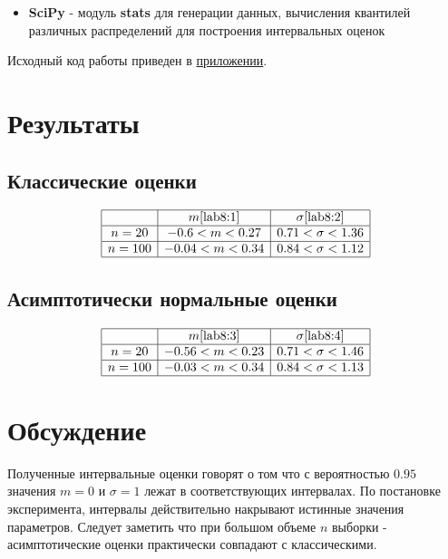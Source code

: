 \documentclass[12pt,a4paper]{article}
\begin{document}
\begin{itemize}
	\item \textbf{SciPy} - модуль \textbf{stats} для генерации данных, вычисления квантилей различных распределений для построения интервальных оценок
\end{itemize}

Исходный код работы приведен в \hyperref[sec:appl]{приложении}. 
\pagebreak

\section{Результаты}
\subsection{Классические оценки}
\begin{equation*}
\begin{array}{|c|c|c|}
	\hline 		& m\eqref{lab8:1} 	& \sigma\eqref{lab8:2} \\
	\hline n=20	& -0.6 < m < 0.27	& 0.71 < \sigma < 1.36 \\
	\hline n=100& -0.04 < m < 0.34 	& 0.84 < \sigma < 1.12 \\
	\hline
\end{array}
\end{equation*}

\subsection{Асимптотически нормальные оценки}
\begin{equation*}
\begin{array}{|c|c|c|}
	\hline 		& m\eqref{lab8:3} 	& \sigma\eqref{lab8:4} \\
	\hline n=20	& -0.56 < m < 0.23 	& 0.71 < \sigma < 1.46 \\
	\hline n=100& -0.03 < m < 0.34 	& 0.84 < \sigma < 1.13 \\
	\hline
\end{array}
\end{equation*}
\pagebreak

\section{Обсуждение}
Полученные интервальные оценки говорят о том что с вероятностью $0.95$ значения $m = 0$ и $\sigma = 1$ лежат в соответствующих интервалах. По постановке эксперимента, интервалы действительно накрывают истинные значения параметров. Следует заметить что при большом объеме $n$ выборки - асимптотические оценки практически совпадают с классическими.
\pagebreak
\end{document}
